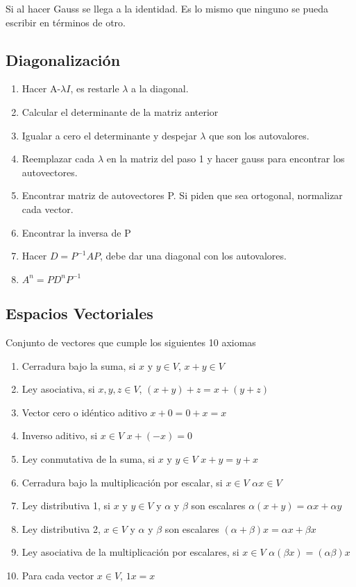 Si al hacer Gauss se llega a la identidad. Es lo mismo que ninguno se pueda escribir en términos de otro.



\subsection{Diagonalización}
\begin{enumerate}
	\item Hacer A-$\lambda I$, es restarle $\lambda$ a la diagonal.
	\item Calcular el determinante de la matriz anterior
	\item Igualar a cero el determinante y despejar $\lambda$ que son los autovalores.
	\item Reemplazar cada $\lambda$ en la matriz del paso 1 y hacer gauss para encontrar los autovectores.
	\item Encontrar matriz de autovectores P. Si piden que sea ortogonal, normalizar cada vector.
	\item Encontrar la inversa de P
	\item Hacer $D=P^{-1}AP$, debe dar una diagonal con los autovalores.
	\item $A^n=PD^nP^{-1}$
\end{enumerate}

\subsection{Espacios Vectoriales}
Conjunto de vectores que cumple los siguientes 10 axiomas
\begin{enumerate}
	\item Cerradura bajo la suma, si $x \text{ y } y  \in V$, $x+y \in V$
	\item Ley asociativa, si $ x, y, z \in V$, $(x+y)+z=x+(y+z)$
	\item Vector cero o idéntico aditivo $x+0=0+x=x$
	\item Inverso aditivo, si $x \in V$ $x+(-x)=0$
	\item Ley conmutativa de la suma, si $x \text{ y } y  \in V$ $x+y=y+x$
	\item Cerradura bajo la multiplicación por escalar, si $x \in V$  $\alpha x \in V$
	\item Ley distributiva 1, si $x \text{ y } y  \in V$  y $\alpha$ y $\beta$ son escalares $\alpha(x+y)=\alpha x+\alpha y$
	\item Ley distributiva 2,  $x \in V$  y $\alpha$ y $\beta$ son escalares $(\alpha + \beta)x=\alpha x+\beta x$
	\item Ley asociativa de la multiplicación por escalares, si $x \in V$ $\alpha(\beta x)=(\alpha \beta)x$
	\item Para cada vector $x \in V$, $1x=x$
\end{enumerate}

